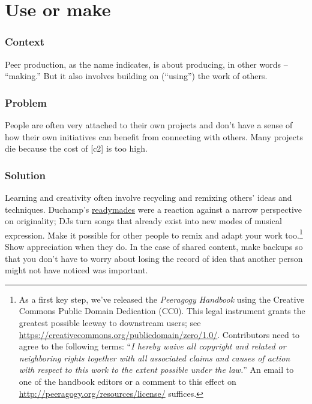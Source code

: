 \begingroup \color{BurntOrange}

\section{Use or make}\label{sec:Use_or_make}
\subsubsection*{Context}
Peer production, as the name indicates, is about producing, in other words --
``making.'' But it also involves building on (``using'') the work of others.

\subsubsection*{Problem}
People are often very attached to their own projects and don't have a sense of how their own initiatives can benefit from connecting with others. Many projects die because the cost of  [c2] is too high.

\subsubsection*{Solution} Learning and creativity often involve recycling and remixing others' ideas and techniques.   Duchamp's {\href{https://en.wikipedia.org/w/index.php?title=Readymades_of_Marcel_Duchamp&oldid=660437742}{readymades}} were a reaction against a narrow perspective on originality; DJs turn songs that already exist into new modes of musical expression.  Make it possible for other people to remix and adapt your work too.\footnote{As a first key step, we've released the \emph{Peeragogy Handbook} using the Creative Commons Public Domain Dedication (CC0).  This legal instrument grants the greatest possible leeway to downstream users; see \url{https://creativecommons.org/publicdomain/zero/1.0/}.  Contributors need to agree to the following terms: ``\emph{I hereby waive all copyright and related or neighboring rights together with all associated claims and causes of action with respect to this work to the extent possible under the law.}''  An email to one of the handbook editors or a comment to this effect on \url{http://peeragogy.org/resources/license/} suffices.}  Show appreciation when they do.  In the case of shared content, make backups so that you don't have to worry about losing the record of idea that another person might not have noticed was important.

